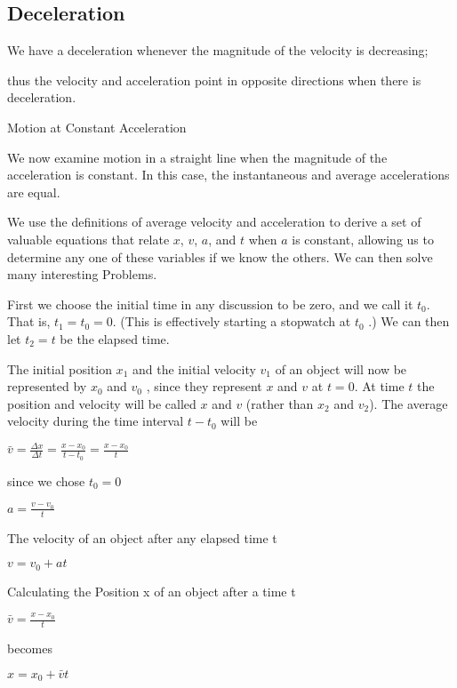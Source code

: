 \documentclass{extarticle}
\begin{document}
\begin{tcolorbox}[enhanced jigsaw,sharp corners,coltext=black,colback=BurntOrange!25!white,boxrule=0pt,breakable,size=minimal]
\subsection{Deceleration}
We have a deceleration whenever the magnitude of the velocity is decreasing;

thus the velocity and acceleration point in opposite directions when there is deceleration.







Motion at Constant Acceleration

We now examine motion in a straight line when the magnitude of the acceleration is constant. In this case, the instantaneous and average accelerations are equal.


We use the definitions of average velocity and acceleration to derive a set of valuable equations that relate $x$, $v$, $a$, and $t$ when $a$ is constant, allowing us to determine any one of these variables if we know the others. We can then solve many interesting Problems.

First we choose the initial time in any discussion to be zero, and we call it $t_0$.
That is,  $t_1 = t_0 = 0$. (This is effectively starting a stopwatch at $t_0$ .)
We can then let $t_2 = t$ be the elapsed time.

The initial position $x_1$ and the initial velocity $v_1$  of an object will now be represented by $x_0$ and $v_0$ , since they represent $x$ and $v$ at $t = 0$.
At time $t$ the position and velocity will be called $x$ and $v$ (rather than $x_2$ and $v_2$).
The average velocity during the time interval $t - t_0$ will be

$\bar{v} = \frac{\Delta x}{\Delta t} = \frac{x - x_0}{t - t_0} = \frac{x - x_0}{t}$

since we chose $t_0 = 0$


$a = \frac{v - v_0}{t}$


The velocity of an object after any elapsed time t

$v = v_0 + at$

Calculating the 
Position x of an object after a time t

$\bar{v} = \frac{x - x_0}{t}$

becomes

$x = x_0 + \bar{v}t$



\end{tcolorbox}
\end{document}
